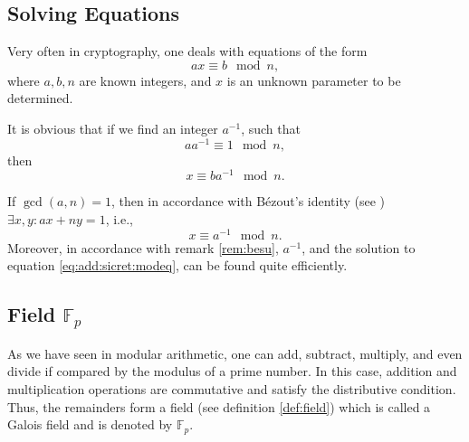 \subsection{Solving Equations}
\label{sec:add:discretmath:mod:equationsolve}
Very often in cryptography, one deals with equations of the form
\begin{equation}
a x \equiv b \mod n,
\label{eq:add:sicret:modeq}
\end{equation}
where $a, b, n$ are known integers, and $x$ is an unknown parameter to be determined.

It is obvious that if we find an integer $a^{-1}$, such that 
\[
a a^{-1} \equiv 1 \mod n,
\]
then
\[
x \equiv b a^{-1} \mod n.
\]

If $\gcd(a, n) = 1$, then in accordance with B\'ezout's identity (see ) 
$\exists x, y: a x + n y = 1$, i.e., 
\[
x \equiv a^{-1} \mod n.
\]
Moreover, in accordance with remark \ref{rem:besu}, $a^{-1}$, and the solution to equation \eqref{eq:add:sicret:modeq}, can be found quite efficiently.

\subsection{Field $\mathbb{F}_p$}
\label{sec:add:diskretmath:mod:fp}
As we have seen in modular arithmetic, one can add, subtract, multiply, and even divide if compared by the modulus of a prime number. In this case, addition and multiplication operations are commutative and satisfy the distributive condition. Thus, the remainders form a field (see definition \ref{def:field}) which is called a Galois field and is denoted by $\mathbb{F}_p$.